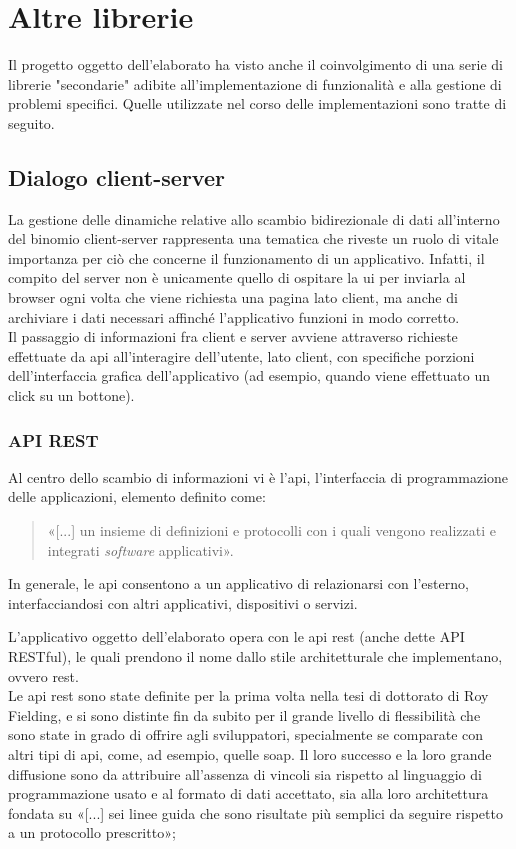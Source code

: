 \section{Altre librerie}
Il progetto oggetto dell'elaborato ha visto anche il coinvolgimento di una serie di librerie "secondarie" adibite all'implementazione di funzionalità e alla gestione di problemi specifici. Quelle utilizzate nel corso delle implementazioni sono tratte di seguito.

\subsection{Dialogo client-server}
\label{subsec:Dialogo client-server}
La gestione delle dinamiche relative allo scambio bidirezionale di dati all'interno del binomio client-server rappresenta una tematica che riveste un ruolo di vitale importanza per ciò che concerne il funzionamento di un applicativo. Infatti, il compito del server non è unicamente quello di ospitare la \acrshort{ui} per inviarla al browser ogni volta che viene richiesta una pagina lato client, ma anche di archiviare i dati necessari affinché l’applicativo funzioni in modo corretto.\\
Il passaggio di informazioni fra client e server avviene attraverso richieste effettuate da \gls{api} all'interagire dell'utente, lato client, con specifiche porzioni dell'interfaccia grafica dell'applicativo (ad esempio, quando viene effettuato un click su un bottone).

\subsubsection{API REST}
\label{subsubsec:API REST}
Al centro dello scambio di informazioni vi è l'\gls{api}, l'interfaccia di programmazione delle applicazioni, elemento definito come:
\begin{quote}
  «[...] un insieme di definizioni e protocolli con i quali vengono realizzati e integrati \textit{software} applicativi»\cite{RedHat_API}.
\end{quote}
In generale, le \gls{api} consentono a un applicativo di relazionarsi con l'esterno, interfacciandosi con altri applicativi, dispositivi o servizi.

L'applicativo oggetto dell'elaborato opera con le \gls{api} \acrshort{rest} (anche dette API RESTful), le quali prendono il nome dallo stile architetturale che implementano, ovvero \acrfull{rest}.\\
Le \gls{api} \acrshort{rest} sono state definite per la prima volta nella tesi di dottorato di Roy Fielding, e si sono distinte fin da subito per il grande livello di flessibilità che sono state in grado di offrire agli sviluppatori, specialmente se comparate con altri tipi di \gls{api}, come, ad esempio, quelle \acrfull{soap}. Il loro successo e la loro grande diffusione sono da attribuire all'assenza di vincoli sia rispetto al linguaggio di programmazione usato e al formato di dati accettato, sia alla loro architettura fondata su «[...] sei linee guida che sono risultate più semplici da seguire rispetto a un protocollo prescritto»\cite{RedHat_VantaggiAPI}; 

